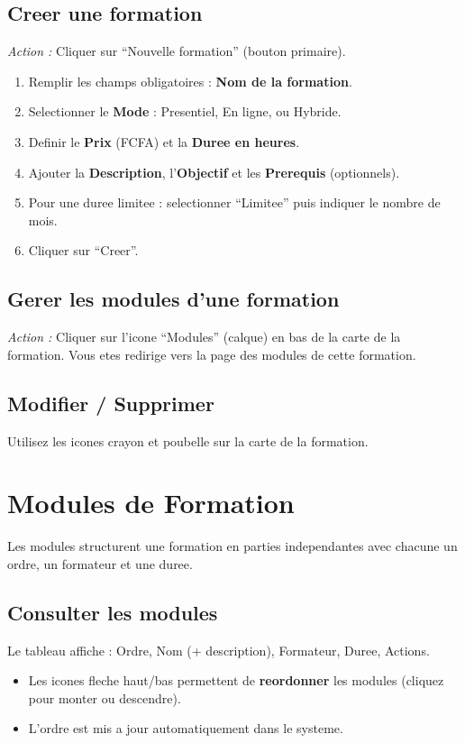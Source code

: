 \documentclass[a4paper,11pt]{article}
\newcommand{\etape}[1]{\textcolor{step}{\textbf{\'Etape :} #1}}
\newcommand{\action}[1]{\textcolor{brand}{\textit{Action :} #1}}
\begin{document}
\subsection{Creer une formation}
\action{Cliquer sur ``Nouvelle formation'' (bouton primaire).}
\begin{enumerate}[label=\etape{\arabic*}]
  \item Remplir les champs obligatoires : \textbf{Nom de la formation}.
  \item Selectionner le \textbf{Mode} : Presentiel, En ligne, ou Hybride.
  \item Definir le \textbf{Prix} (FCFA) et la \textbf{Duree en heures}.
  \item Ajouter la \textbf{Description}, l'\textbf{Objectif} et les \textbf{Prerequis} (optionnels).
  \item Pour une duree limitee : selectionner ``Limitee'' puis indiquer le nombre de mois.
  \item Cliquer sur ``Creer''.
\end{enumerate}

\subsection{Gerer les modules d'une formation}
\action{Cliquer sur l'icone ``Modules'' (calque) en bas de la carte de la formation.}
Vous etes redirige vers la page des modules de cette formation.

\subsection{Modifier / Supprimer}
Utilisez les icones crayon et poubelle sur la carte de la formation.


\section{Modules de Formation}

Les modules structurent une formation en parties independantes avec chacune un ordre, un formateur et une duree.

\subsection{Consulter les modules}
Le tableau affiche : Ordre, Nom (+ description), Formateur, Duree, Actions.
\begin{itemize}
  \item Les icones fleche haut/bas permettent de \textbf{reordonner} les modules (cliquez pour monter ou descendre).
  \item L'ordre est mis a jour automatiquement dans le systeme.
\end{itemize}
\end{document}
